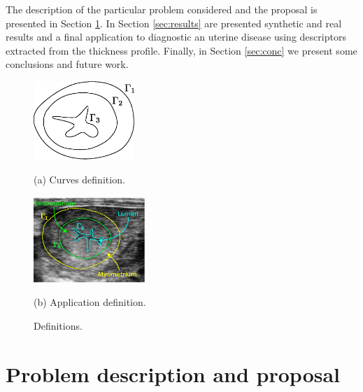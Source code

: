 \documentclass{article}
\begin{document}
The description of the particular problem considered and the proposal is presented in Section \ref{sec:proposal}. In Section \ref{sec:results} are presented synthetic and real results and a final application to diagnostic an uterine disease using descriptors extracted from the thickness profile. Finally, in Section \ref{sec:conc} we present some conclusions and future work.

\begin{figure}[t]
\begin{minipage}[b]{.45\linewidth}
  \centering
  \centerline{\includegraphics[width=3.8cm]{pics/defs2}}
  \centerline{(a) Curves definition.}\medskip
\end{minipage}\hfill
\begin{minipage}[b]{.52\linewidth}
  \centering
  \centerline{\includegraphics[width=4.2cm]{pics/defsEndo}}
  \centerline{(b) Application definition.}\medskip
\end{minipage}
\caption{Definitions.}
\label{fig:defs}
\end{figure}

\section{Problem description and proposal}
\label{sec:proposal}
\end{document}

